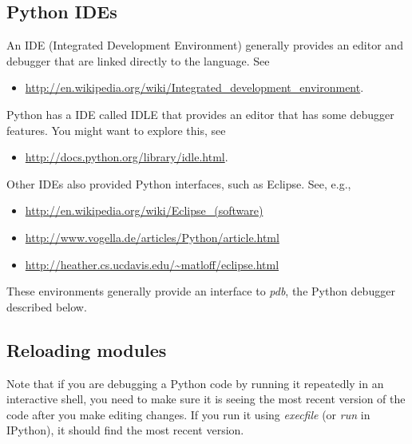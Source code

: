 \documentclass[letterpaper,10pt,english]{sphinxmanual}
\begin{document}
\subsection{Python IDEs}
\label{python_debugging:python-ides}
An IDE (Integrated Development Environment) generally provides an editor and
debugger that are linked directly to the language.   See
\begin{itemize}
\item {} 
\href{http://en.wikipedia.org/wiki/Integrated\_development\_environment}{http://en.wikipedia.org/wiki/Integrated\_development\_environment}.

\end{itemize}

Python has a IDE called IDLE that
provides an editor that has some debugger features.  You might want to
explore this, see
\begin{itemize}
\item {} 
\href{http://docs.python.org/library/idle.html}{http://docs.python.org/library/idle.html}.

\end{itemize}

Other IDEs also provided Python interfaces, such as Eclipse.
See, e.g.,
\begin{itemize}
\item {} 
\href{http://en.wikipedia.org/wiki/Eclipse\_(software)}{http://en.wikipedia.org/wiki/Eclipse\_(software)}

\item {} 
\href{http://www.vogella.de/articles/Python/article.html}{http://www.vogella.de/articles/Python/article.html}

\item {} 
\href{http://heather.cs.ucdavis.edu/~matloff/eclipse.html}{http://heather.cs.ucdavis.edu/\textasciitilde{}matloff/eclipse.html}

\end{itemize}

These environments generally provide an interface to \emph{pdb}, the Python
debugger described below.


\subsection{Reloading modules}
\label{python_debugging:reloading-modules}
Note that if you are debugging a Python code by running it repeatedly in an
interactive shell, you need to make sure it is seeing the most recent
version of the code after you make editing changes.  If you run it using
\emph{execfile} (or \emph{run} in IPython), it should find the most recent version.
\end{document}
